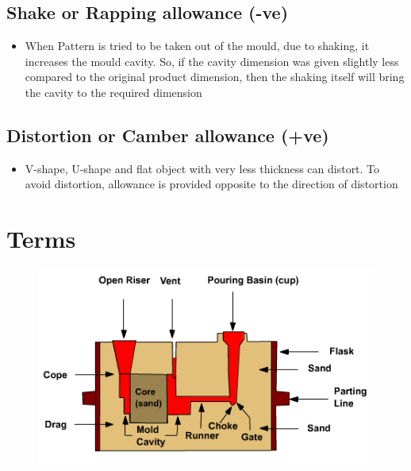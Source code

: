 \documentclass[8pt]{report}
\begin{document}
\begin{itemize}
		\subsection{Shake or Rapping allowance (-ve)}
			\begin{itemize}
				\item When Pattern is tried to be taken out of the mould, due to shaking, it increases the mould cavity. So, if the cavity dimension was given slightly less compared to the original product dimension, then the shaking itself will bring the cavity to the required dimension
			\end{itemize}\hrulefill
		\subsection{Distortion or Camber allowance (+ve)}
			\begin{itemize}
				\item V-shape, U-shape and flat object with very less thickness can distort. To avoid distortion, allowance is provided opposite to the direction of distortion
			\end{itemize}\hrulefill
	\end{itemize}\hrulefill
\section{Terms}
	\begin{figure}[H]
		\centering
		\includegraphics[scale=0.5]{Terms.png}
	\end{figure}
\end{document}

